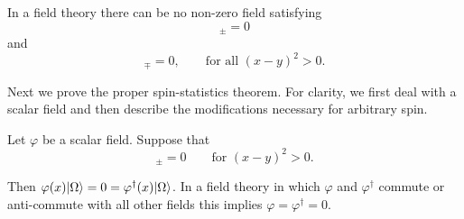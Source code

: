 \begin{corollary*}

In a field theory there can be no non-zero field satisfying
\begin{equation}
  [\varphi(x),\varphi(y)]_{\pm}=0
  \tag{4-40}\label{eq:ch4-40-no-nonzero-field-first}
\end{equation}
and
\begin{equation*}
  [\varphi(x),\varphi^\dagger(y)]_{\mp}=0,
  \qquad\text{for all }(x-y)^2>0.
\end{equation*}
\end{corollary*}

Next we prove the proper spin-statistics theorem.  For clarity, we first deal
with a scalar field and then describe the modifications necessary for arbitrary
spin.

\begin{theorem}
\label{thm:ch4-9-scalar-spin-statistics}

Let $\varphi$ be a scalar field.  Suppose that
\begin{equation}
  [\varphi(x),\varphi^\dagger(y)]_{\pm}=0
  \qquad\text{for }(x-y)^2>0.
  \tag{4-41}\label{eq:ch4-41-wrong-scalar-statistics}
\end{equation}

Then $\varphi(x)\lvert \Omega\rangle=0=\varphi^\dagger(x)\lvert \Omega\rangle$.  In a field
theory in which $\varphi$ and $\varphi^\dagger$ commute or anti-commute with
all other fields this implies $\varphi=\varphi^\dagger=0$.
\end{theorem}

